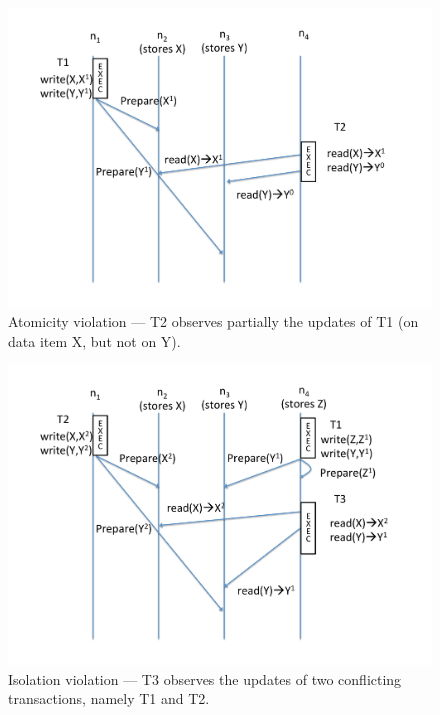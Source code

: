 \begin{figure}[t!]
\centering
\hspace{-5mm}
\includegraphics[scale = 0.24]{figures/example1.pdf}
\caption{\footnotesize Atomicity violation --- T2 observes partially the updates of T1 (on data item X, but not on Y).}
\label{fig:ex1}
\end{figure}

\begin{figure}[t!]
\centering
\hspace{-5mm}
\includegraphics[scale = 0.24]{figures/example2.pdf}
\caption{\footnotesize Isolation violation --- T3 observes the updates of two conflicting transactions, namely T1 and T2.}
\label{fig:ex2}
\end{figure}

